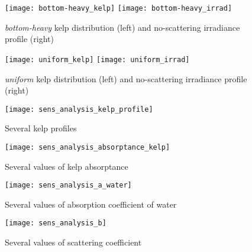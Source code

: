 \begin{figure}[H]
  \centering
  \vspace{-3em}
  \texttt{[image: bottom-heavy\_kelp]}
  \texttt{[image: bottom-heavy\_irrad]}
  \caption{\textit{bottom-heavy} kelp distribution (left) and no-scattering irradiance profile (right)}
\end{figure}

\begin{figure}[H]
  \centering
  \vspace{-3em}
  \texttt{[image: uniform\_kelp]}
  \texttt{[image: uniform\_irrad]}
  \caption{\textit{uniform} kelp distribution (left) and no-scattering irradiance profile (right)}
\end{figure}

\begin{figure}[H]
  \centering
  \texttt{[image: sens\_analysis\_kelp\_profile]}
  \caption{Several kelp profiles}
\end{figure}

\begin{figure}[H]
  \centering
  \texttt{[image: sens\_analysis\_absorptance\_kelp]}
  \caption{Several values of kelp absorptance}
\end{figure}

\begin{figure}[H]
  \centering
  \texttt{[image: sens\_analysis\_a\_water]}
  \caption{Several values of absorption coefficient of water}
  \label{fig:sens_analysis_a_water}
\end{figure}

\begin{figure}[H]
  \centering
  \texttt{[image: sens\_analysis\_b]}
  \caption{Several values of scattering coefficient}
  \label{fig:sens_analysis_b}
\end{figure}
